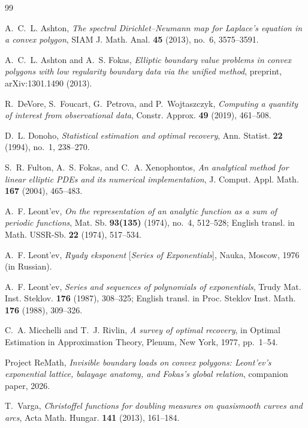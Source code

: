 \documentclass[11pt,reqno]{amsart}
\theoremstyle{definition}
\theoremstyle{remark}
\begin{document}
\begin{thebibliography}{99}

A.~C.~L. Ashton, \emph{The spectral Dirichlet--Neumann map for Laplace's equation in a convex polygon}, SIAM J. Math. Anal. \textbf{45} (2013), no.~6, 3575--3591.

A.~C.~L. Ashton and A.~S. Fokas, \emph{Elliptic boundary value problems in convex polygons with low regularity boundary data via the unified method}, preprint, arXiv:1301.1490 (2013).

R.~DeVore, S.~Foucart, G.~Petrova, and P.~Wojtaszczyk, \emph{Computing a quantity of interest from observational data}, Constr. Approx. \textbf{49} (2019), 461--508.

D.~L. Donoho, \emph{Statistical estimation and optimal recovery}, Ann. Statist. \textbf{22} (1994), no.~1, 238--270.

S.~R. Fulton, A.~S. Fokas, and C.~A. Xenophontos, \emph{An analytical method for linear elliptic PDEs and its numerical implementation}, J. Comput. Appl. Math. \textbf{167} (2004), 465--483.

A.~F. Leont'ev, \emph{On the representation of an analytic function as a sum of periodic functions}, Mat. Sb. \textbf{93(135)} (1974), no.~4, 512--528; English transl. in Math. USSR-Sb. \textbf{22} (1974), 517--534.

A.~F. Leont'ev, \emph{Ryady eksponent} [\emph{Series of Exponentials}], Nauka, Moscow, 1976 (in Russian).

A.~F. Leont'ev, \emph{Series and sequences of polynomials of exponentials}, Trudy Mat. Inst. Steklov. \textbf{176} (1987), 308--325; English transl. in Proc. Steklov Inst. Math. \textbf{176} (1988), 309--326.

C.~A. Micchelli and T.~J. Rivlin, \emph{A survey of optimal recovery}, in Optimal Estimation in Approximation Theory, Plenum, New York, 1977, pp.~1--54.

Project ReMath, \emph{Invisible boundary loads on convex polygons: Leont'ev's exponential lattice, balayage anatomy, and Fokas's global relation}, companion paper, 2026.

T.~Varga, \emph{Christoffel functions for doubling measures on quasismooth curves and arcs}, Acta Math. Hungar. \textbf{141} (2013), 161--184.

\end{thebibliography}
\end{document}
